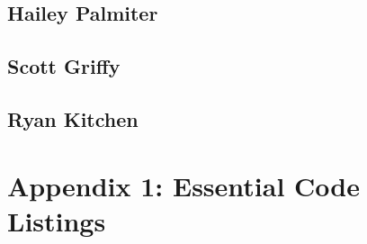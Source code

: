 \documentclass[letterpaper, onecolumn,10pt,draftclsnofoot]{IEEEtran}
\begin{document}
	\subsection{Hailey Palmiter}
		
	\subsection{Scott Griffy}
		
	\subsection{Ryan Kitchen}
		
		
\section{Appendix 1: Essential Code Listings}





   
\end{document}
